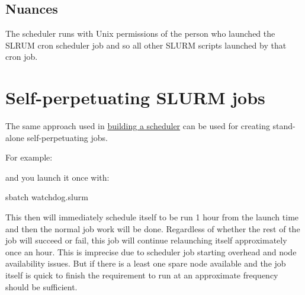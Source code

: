 \documentclass[
]{report}
\newenvironment{Shaded}{\begin{snugshade}}{\end{snugshade}}
\newcommand{\AttributeTok}[1]{\textcolor[rgb]{0.40,0.45,0.13}{#1}}
\newcommand{\CommentTok}[1]{\textcolor[rgb]{0.37,0.37,0.37}{#1}}
\newcommand{\ExtensionTok}[1]{\textcolor[rgb]{0.00,0.23,0.31}{#1}}
\newcommand{\NormalTok}[1]{\textcolor[rgb]{0.00,0.23,0.31}{#1}}
\newcommand{\OperatorTok}[1]{\textcolor[rgb]{0.37,0.37,0.37}{#1}}
\newcommand{\VariableTok}[1]{\textcolor[rgb]{0.07,0.07,0.07}{#1}}
\begin{document}
\subsection{Nuances}\label{nuances}

The scheduler runs with Unix permissions of the person who launched the
SLRUM cron scheduler job and so all other SLURM scripts launched by that
cron job.

\section{Self-perpetuating SLURM
jobs}\label{self-perpetuating-slurm-jobs}

The same approach used in
\hyperref[1-a-self-perpetuating-scheduler-job]{building a scheduler} can
be used for creating stand-alone self-perpetuating jobs.

For example:

\begin{Shaded}
\end{Shaded}

and you launch it once with:

\begin{Shaded}
\begin{Highlighting}[]
\ExtensionTok{sbatch}\NormalTok{ watchdog.slurm}
\end{Highlighting}
\end{Shaded}

This then will immediately schedule itself to be run 1 hour from the
launch time and then the normal job work will be done. Regardless of
whether the rest of the job will succeed or fail, this job will continue
relaunching itself approximately once an hour. This is imprecise due to
scheduler job starting overhead and node availability issues. But if
there is a least one spare node available and the job itself is quick to
finish the requirement to run at an approximate frequency should be
sufficient.
\end{document}
